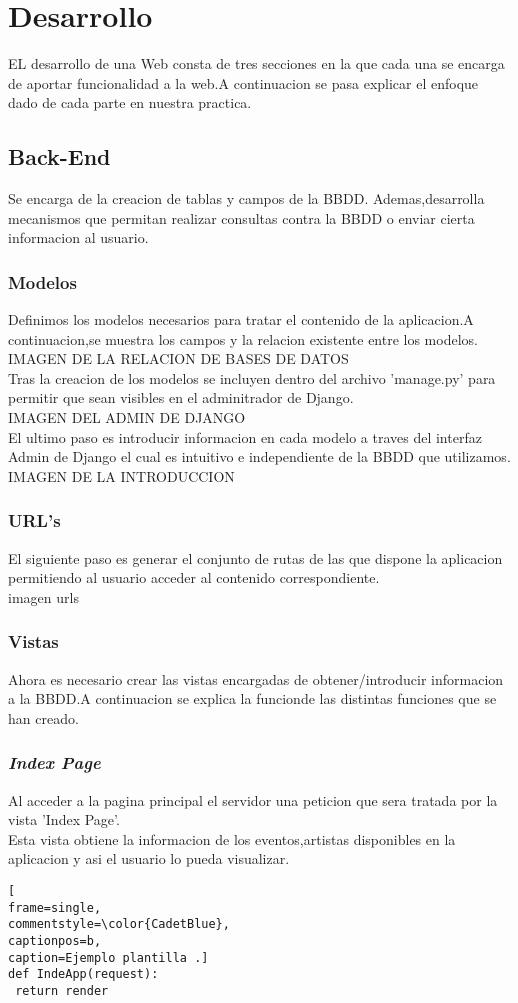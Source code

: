 \section{Desarrollo}
EL desarrollo de una Web consta de tres secciones en la que cada una se encarga de aportar funcionalidad a la web.A continuacion se pasa explicar el enfoque dado de cada parte en nuestra practica.
\subsection{Back-End}
Se encarga de la creacion de tablas y campos de la BBDD.
Ademas,desarrolla mecanismos que permitan realizar consultas contra la BBDD o enviar cierta informacion al usuario.
\subsubsection*{Modelos}
Definimos los modelos necesarios para tratar el contenido de la aplicacion.A continuacion,se muestra los campos y la relacion existente entre los modelos.
\\IMAGEN DE LA RELACION DE BASES DE DATOS
\\Tras la creacion de los modelos se incluyen dentro del archivo 'manage.py' para permitir que sean visibles en el adminitrador de Django.
\\IMAGEN DEL ADMIN DE DJANGO
\\El ultimo paso es introducir informacion en cada modelo a traves del interfaz  Admin de Django el cual es intuitivo e independiente de la BBDD que utilizamos. 
\\IMAGEN DE LA INTRODUCCION 
\subsubsection*{URL's}
El siguiente paso es generar el conjunto de rutas de las que dispone la aplicacion permitiendo al usuario acceder al contenido correspondiente.
\\imagen urls
\subsubsection*{Vistas}
Ahora es necesario crear las vistas encargadas de obtener/introducir informacion a la BBDD.A continuacion se explica la funcionde las distintas funciones que se han creado.
\subsubsection*{\textit{Index Page}}
Al acceder a la pagina principal el servidor una peticion que sera tratada por la vista 'Index Page'.
\\Esta vista obtiene la informacion de los eventos,artistas disponibles en la aplicacion y asi el usuario lo pueda visualizar.
\begin{lstlisting}[
frame=single,
commentstyle=\color{CadetBlue},
captionpos=b,
caption=Ejemplo plantilla .]
def IndeApp(request):
 return render 
\end{lstlisting}
